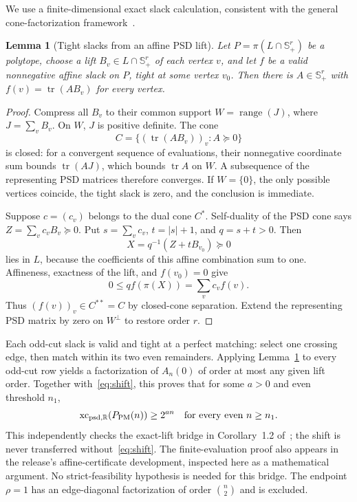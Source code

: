 \documentclass[11pt]{article}
\newtheorem{lemma}[theorem]{Lemma}
\newcommand{\R}{\mathbb R}
\newcommand{\Splus}{\mathbb S_+}
\newcommand{\sxc}{\operatorname{xc}_{\mathrm{psd},\R}}
\newcommand{\PM}{P_{\mathrm{PM}}}
\begin{document}
We use a finite-dimensional exact slack calculation, consistent with the general cone-factorization framework~\cite{gpt}.
\begin{lemma}[Tight slacks from an affine PSD lift]\label{lem:slacks}
Let $P=\pi(L\cap\Splus^r)$ be a polytope, choose a lift $B_v\in L\cap\Splus^r$ of each vertex $v$, and let $f$ be a valid nonnegative affine slack on $P$, tight at some vertex $v_0$. Then there is $A\in\Splus^r$ with $f(v)=\operatorname{tr}(AB_v)$ for every vertex.
\end{lemma}
\begin{proof}
Compress all $B_v$ to their common support $W=\operatorname{range}(J)$, where $J=\sum_vB_v$. On $W$, $J$ is positive definite. The cone
\[
 C=\{(\operatorname{tr}(AB_v))_v:A\succeq0\}
\]
is closed: for a convergent sequence of evaluations, their nonnegative coordinate sum bounds $\operatorname{tr}(AJ)$, which bounds $\operatorname{tr}A$ on $W$. A subsequence of the representing PSD matrices therefore converges. If $W=\{0\}$, the only possible vertices coincide, the tight slack is zero, and the conclusion is immediate.

Suppose $c=(c_v)$ belongs to the dual cone $C^*$. Self-duality of the PSD cone says $Z=\sum_v c_vB_v\succeq0$. Put $s=\sum_vc_v$, $t=|s|+1$, and $q=s+t>0$. Then
\[
 X=q^{-1}(Z+tB_{v_0})\succeq0
\]
lies in $L$, because the coefficients of this affine combination sum to one. Affineness, exactness of the lift, and $f(v_0)=0$ give
\[
 0\le q f(\pi(X))=\sum_vc_vf(v).
\]
Thus $(f(v))_v\in C^{**}=C$ by closed-cone separation. Extend the representing PSD matrix by zero on $W^\perp$ to restore order $r$.
\end{proof}
Each odd-cut slack is valid and tight at a perfect matching: select one crossing edge, then match within its two even remainders. Applying Lemma~\ref{lem:slacks} to every odd-cut row yields a factorization of $A_n(0)$ of order at most any given lift order. Together with~\eqref{eq:shift}, this proves that for some $a>0$ and even threshold $n_1$,
\begin{equation}\label{eq:matching}
 \sxc(\PM(n))\ge2^{an}\quad\hbox{for every even }n\ge n_1.
\end{equation}
This independently checks the exact-lift bridge in Corollary~1.2 of~\cite{openai126}; the shift is never transferred without~\eqref{eq:shift}. The finite-evaluation proof also appears in the release's affine-certificate development, inspected here as a mathematical argument. No strict-feasibility hypothesis is needed for this bridge. The endpoint $\rho=1$ has an edge-diagonal factorization of order $\binom n2$ and is excluded.
\end{document}
